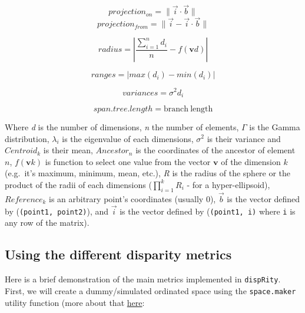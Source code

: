 \documentclass[
]{book}
\begin{document}
\begin{equation}
    projection_{on} = \| \overrightarrow{i} \cdot \overrightarrow{b} \|
\end{equation}
\begin{equation}
    projection_{from} = \| \overrightarrow{i} - \overrightarrow{i} \cdot \overrightarrow{b} \|
\end{equation}

\begin{equation}
    radius = |\frac{\sum_{i=1}^{n}d_i}{n} - f(\mathbf{v}d)|
\end{equation}

\begin{equation}
    ranges = |max(d_i) - min(d_i)|
\end{equation}

\begin{equation}
    variances = \sigma^{2}{d_i}
\end{equation}

\begin{equation}
    span.tree.length = \mathrm{branch\ length}
\end{equation}

Where \emph{d} is the number of dimensions,
\emph{n} the number of elements,
\(\Gamma\) is the Gamma distribution,
\(\lambda_i\) is the eigenvalue of each dimensions,
\(\sigma^{2}\) is their variance and
\(Centroid_{k}\) is their mean,
\(Ancestor_{n}\) is the coordinates of the ancestor of element \(n\),
\(f(\mathbf{v}k)\) is function to select one value from the vector \(\mathbf{v}\) of the dimension \(k\) (e.g.~it's maximum, minimum, mean, etc.),
\emph{R} is the radius of the sphere or the product of the radii of each dimensions (\(\displaystyle\prod_{i=1}^{k}R_{i}\) - for a hyper-ellipsoid),
\(Reference_{k}\) is an arbitrary point's coordinates (usually 0),
\(\overrightarrow{b}\) is the vector defined by (\texttt{(point1,\ point2)}),
and \(\overrightarrow{i}\) is the vector defined by (\texttt{(point1,\ i)} where \texttt{i} is any row of the matrix).

\hypertarget{using-the-different-disparity-metrics}{%
\subsection{Using the different disparity metrics}\label{using-the-different-disparity-metrics}}

Here is a brief demonstration of the main metrics implemented in \texttt{dispRity}.
First, we will create a dummy/simulated ordinated space using the \texttt{space.maker} utility function (more about that \protect\hyperlink{space.maker}{here}:
\end{document}
